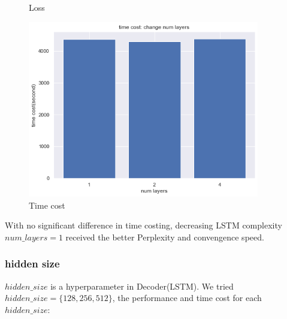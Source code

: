\begin{figure}[H]
\begin{minipage}[b]{0.3\textwidth}
    \caption{Loss}
    \label{Fig.2}
    \end{minipage}
    \begin{minipage}[b]{0.3\textwidth}
    \centering 
    \includegraphics[width=0.9\textwidth]{time_layer.png}
    \caption{Time cost}
    \label{Fig.2}
    \end{minipage}
\end{figure}
With no significant difference in time costing, decreasing LSTM complexity $num\_layers = 1$ received the better Perplexity and convengence speed.
\subsubsection{hidden size}
$hidden\_size$ is a hyperparameter in Decoder(LSTM). We tried $hidden\_size = \{128, 256, 512\}$, the performance and time cost for each $hidden\_size$:\\

